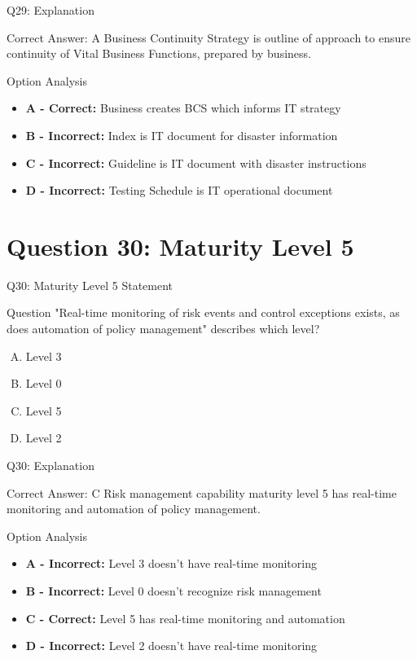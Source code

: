 \documentclass{beamer}
\begin{document}
	\begin{frame}{Q29: Explanation}
		\begin{block}{Correct Answer: A}
			Business Continuity Strategy is outline of approach to ensure continuity of Vital Business Functions, prepared by business.
		\end{block}
		\begin{block}{Option Analysis}
			\begin{itemize}
				\item \textbf{A - Correct:} Business creates BCS which informs IT strategy
				\item \textbf{B - Incorrect:} Index is IT document for disaster information
				\item \textbf{C - Incorrect:} Guideline is IT document with disaster instructions
				\item \textbf{D - Incorrect:} Testing Schedule is IT operational document
			\end{itemize}
		\end{block}
	\end{frame}
	
	\section{Question 30: Maturity Level 5}
	
	\begin{frame}{Q30: Maturity Level 5 Statement}
		\begin{block}{Question}
			"Real-time monitoring of risk events and control exceptions exists, as does automation of policy management" describes which level?
		\end{block}
		\begin{enumerate}[(A)]
			\item Level 3
			\item Level 0
			\item Level 5
			\item Level 2
		\end{enumerate}
	\end{frame}
	
	\begin{frame}{Q30: Explanation}
		\begin{block}{Correct Answer: C}
			Risk management capability maturity level 5 has real-time monitoring and automation of policy management.
		\end{block}
		\begin{block}{Option Analysis}
			\begin{itemize}
				\item \textbf{A - Incorrect:} Level 3 doesn't have real-time monitoring
				\item \textbf{B - Incorrect:} Level 0 doesn't recognize risk management
				\item \textbf{C - Correct:} Level 5 has real-time monitoring and automation
				\item \textbf{D - Incorrect:} Level 2 doesn't have real-time monitoring
			\end{itemize}
		\end{block}
	\end{frame}
	
\end{document}

